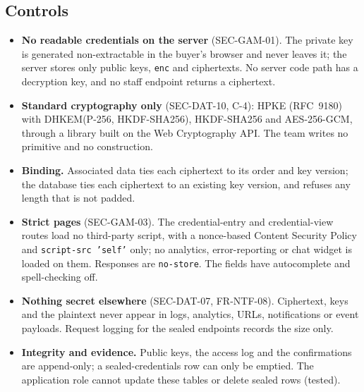 \documentclass[11pt,a4paper]{article}
\begin{document}
\subsection{Controls}
\begin{itemize}[nosep]
  \item \textbf{No readable credentials on the server} (SEC-GAM-01). The private key is generated non-extractable in the buyer's browser and never leaves it; the server stores only public keys, \texttt{enc} and ciphertexts. No server code path has a decryption key, and no staff endpoint returns a ciphertext.
  \item \textbf{Standard cryptography only} (SEC-DAT-10, C-4): HPKE (RFC~9180) with DHKEM(P-256, HKDF-SHA256), HKDF-SHA256 and AES-256-GCM, through a library built on the Web Cryptography API. The team writes no primitive and no construction.
  \item \textbf{Binding.} Associated data ties each ciphertext to its order and key version; the database ties each ciphertext to an existing key version, and refuses any length that is not padded.
  \item \textbf{Strict pages} (SEC-GAM-03). The credential-entry and credential-view routes load no third-party script, with a nonce-based Content Security Policy and \texttt{script-src 'self'} only; no analytics, error-reporting or chat widget is loaded on them. Responses are \texttt{no-store}. The fields have autocomplete and spell-checking off.
  \item \textbf{Nothing secret elsewhere} (SEC-DAT-07, FR-NTF-08). Ciphertext, keys and the plaintext never appear in logs, analytics, URLs, notifications or event payloads. Request logging for the sealed endpoints records the size only.
  \item \textbf{Integrity and evidence.} Public keys, the access log and the confirmations are append-only; a sealed-credentials row can only be emptied. The application role cannot update these tables or delete sealed rows (tested).
\end{itemize}
\end{document}
